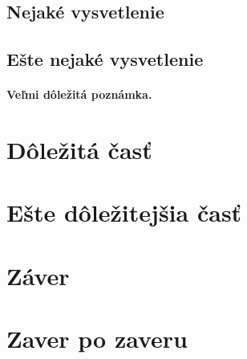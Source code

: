 \documentclass[10pt,twoside,slovak,a4paper]{coursepaper}
\begin{document}
\subsection{Nejaké vysvetlenie} \label{ina:nejake}
\subsection{Ešte nejaké vysvetlenie} \label{ina:este}
\paragraph{Veľmi dôležitá poznámka.}

\section{Dôležitá časť} \label{dolezita}
\section{Ešte dôležitejšia časť} \label{dolezitejsia}
\section{Záver} \label{zaver}
\section{Zaver po zaveru}



\end{document}
